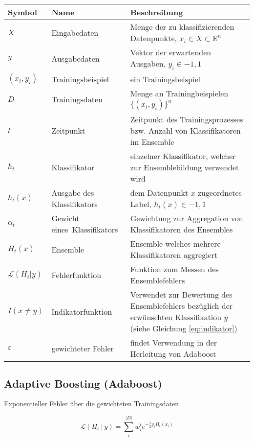 \documentclass[a4paper,12pt]{scrartcl}
\begin{document}
\begin{tabular}{C{0.1\textwidth}p{0.3\textwidth}p{0.6\textwidth}}
	\toprule
	Symbol & Name &  Beschreibung \\
	\midrule
	$X$ & Eingabedaten & Menge der zu klassifizierenden Datenpunkte, \mbox{$x_i \in X \subset \mathbb{R}^n$}\\
	$y$ & Ausgabedaten & Vektor der erwartenden Ausgaben, $y_i \in {-1, 1}$ \\
	$(x_i, y_i)$ & Trainingsbeispiel & ein Trainingsbeispiel \\ 
	$D$ & Trainingsdaten & Menge an Trainingbeispielen $\lbrace (x_i, y_i)\rbrace^n$\\
	$t$ & Zeitpunkt & Zeitpunkt des Trainingsprozesses bzw. Anzahl von Klassifikatoren im Ensemble\\
	$h_t$ & Klassifikator & einzelner Klassifikator, welcher zur Ensemblebildung verwendet wird\\
	$h_t(x)$ & Ausgabe des Klassifikators & dem Datenpunkt $x$ zugeordnetes Label, $h_t(x)\in {-1, 1}$ \\
	$\alpha_t$ & Gewicht \mbox{eines Klassifikators} & Gewichtung zur Aggregation von Klassifikatoren des Ensembles\\
	$H_t(x)$ & Ensemble & Ensemble welches mehrere Klassifikatoren aggregiert\\
	$\mathcal{L}(H_t\vert y)$ & Fehlerfunktion & Funktion zum Messen des Ensemblefehlers\\
	$I(x \neq y)$ & Indikatorfunktion & Verwendet zur Bewertung des Ensemblefehlers bezüglich der erwünschten Klassifikation $y$ (siehe Gleichung \ref{eq:indikator})\\
	$\varepsilon$ & gewichteter Fehler & findet Verwendung in der Herleitung von Adaboost\\
	\bottomrule
\end{tabular}

\subsection{Adaptive Boosting (Adaboost)}

\begin{equationfloat}[!h]
	\caption{Exponentieller Fehler über die gewichteten Trainingsdaten}
	\begin{equation}
		\mathcal{L}(H_t~\vert~y) =\sum_i^{\vert D\vert} w_i^t e^{-\frac{1}{2}y_i H_t(x_i)}
	\end{equation}
\end{equationfloat}
\end{document}
